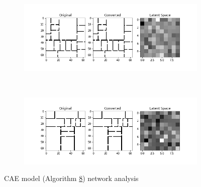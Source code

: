 \begin{figure}
    \centerfloat
    \begin{subfigure}[b]{1.25\linewidth}
        \includegraphics[width=\linewidth]{images/cae_online_lstm/caelstm_section_cae_training_house_10000_model_network_analysis_0.png}
    \end{subfigure}
    \\[-1.5cm]
    \begin{subfigure}[b]{1.25\linewidth}
        \includegraphics[width=\linewidth]{images/cae_online_lstm/caelstm_section_cae_training_house_10000_model_network_analysis_1.png}
    \end{subfigure}
    
    \caption{CAE model (Algorithm \hyperref[tab: app_evalalgorithms]{8}) network analysis}
    \label{fig: cae_8_net_analysis}
\end{figure}

